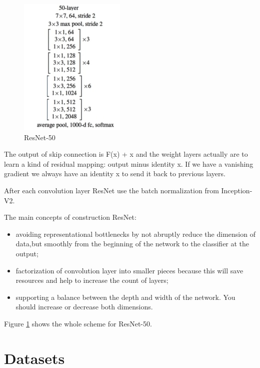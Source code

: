 \documentclass[titlepage]{report}
\begin{document}
\begin{figure}
\centering
\includegraphics[scale=0.8]{resnet_2}
\caption{ResNet-50}
\label{fig:resnet_50}
\end{figure}

The output of skip connection is  F(x) + x and the weight layers actually are to learn a kind of residual mapping: output minus identity x. If we have a vanishing gradient we always have an identity x to send it back to previous layers. 

After each convolution layer ResNet use the batch normalization from Inception-V2. 

The main concepts of construction ResNet:
\begin{itemize}
  \item avoiding representational bottlenecks by not abruptly reduce the dimension of data,but smoothly from the beginning of the network to the classifier at the output;
  \item factorization of convolution layer into smaller pieces because this will save resources and help to increase the count of layers;
  \item supporting a balance between the depth and width of the network. You should increase or decrease both dimensions.
\end{itemize}

Figure \ref{fig:resnet_50} shows the whole scheme for ResNet-50.


\section{Datasets}
\lipsum[3]
\end{document}

